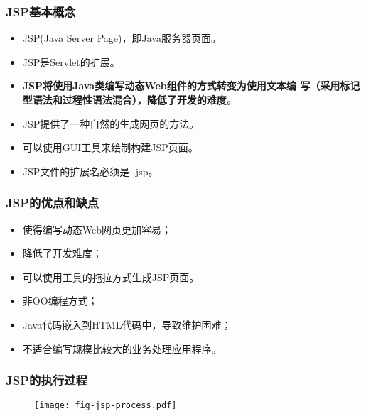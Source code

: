 \begin{frame}
  \frametitle{JSP基本概念}

  \begin{itemize}
  \item JSP(Java Server Page)，即Java服务器页面。
  \item JSP是Servlet的扩展。
  \item {\bf\Blue JSP将使用Java类编写动态Web组件的方式转变为使用文本编
      写（采用标记型语法和过程性语法混合），降低了开发的难度。}
  \item JSP提供了一种自然的生成网页的方法。
  \item 可以使用GUI工具来绘制构建JSP页面。
  \item JSP文件的扩展名必须是 .jsp。
  \end{itemize}
\end{frame}

\begin{frame}[fragile] %
  \frametitle{JSP的优点和缺点}

  
  \begin{itemize}
  \item 使得编写动态Web网页更加容易；
  \item 降低了开发难度；
  \item 可以使用工具的拖拉方式生成JSP页面。
  \end{itemize}

  
  \begin{itemize}
  \item 非OO编程方式；
  \item Java代码嵌入到HTML代码中，导致维护困难；
  \item 不适合编写规模比较大的业务处理应用程序。
  \end{itemize}
\end{frame}

\begin{frame}[fragile] %
  \frametitle{JSP的执行过程} 
  \begin{figure}
    \centering
    \texttt{[image: fig-jsp-process.pdf]}
  \end{figure}
\end{frame}

